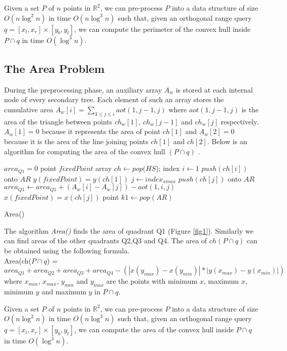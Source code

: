 \documentclass[runningheads,a4paper]{llncs}
\begin{document}
{\begin{theorem}
  Given a set $P$ of $n$ points in $\mathbb{R}^{2}$, we can pre-process $P$
  into a data structure of size $O(n \log^{2} n)$ in time $O(n \log^{3} n)$
  such that, given an orthogonal range query $q = [x_{l}, x_{r}] \times
  [y_{b}, y_{t}]$, we can compute the perimeter of the convex hull inside $P
  \cap q$ in time $O(\log^{3} n)$.
\end{theorem}

\subsection{The Area Problem}
During the preprocessing phase, an auxiliary array $A_{w}$ is stored at each
internal node of every secondary tree.  Each element of such an array stores
the cumulative area $A_{w}[i]=\displaystyle\sum\limits_{3\le j\le i}
aot(1,j-1,j)$ where $aot(1,j-1,j)$ is the area of the triangle between points
$ch_{w}[1]$, $ch_{w}[j-1]$ and $ch_{w}[j]$ respectively.  $A_{w}[1]=0$ because
it represents the area of point $ch[1]$ and $A_{w}[2]=0$ because it is the area
of the line joining points $ch[1]$ and $ch[2]$. Below is an algorithm for computing the area of the convex hull $(P \cap q)$ .
\begin{algorithm}
  $area_{Q1}=0$\;
  point $fixedPoint$
  array $ch \leftarrow pop(HS$);
  index $i \leftarrow 1$\;
  $push(ch[i])$ onto $AR$\;
  $y(fixedPoint) = y(ch[1])$\;
  $j \leftarrow index_{xmax}$\;
  $push(ch[j])$ onto $AR$\;
  $area_{Q1} \leftarrow area_{Q1}+(A_{w}[i]-A_{w}[j]) - aot(1,i,j)$\;
  $x(fixedPoint) = x(ch[j])$\;
  point $k1 \leftarrow pop(AR)$\;
\caption{Area()}\end{algorithm}
\vspace{-0.6cm}
The  algorithm {\em Area()} finds the area of quadrant Q1 (Figure
\ref{fig1}). Similarly we can find areas of the other quadrants Q2,Q3 and
Q4. The area of $ch(P \cap q)$ can be obtained using the following formula.\\
Area(ch($P \cap q$) = $area_{Q1}+area_{Q2}+area_{Q3}+area_{Q4} - (|x(y_{max})
- x(y_{min})|*|y(x_{max}) - y(x_{min})|)$ where $x_{min}$, $x_{max}$, $y_{min}$ and $y_{max}$
are the points with minimum $x$, maximum $x$, minimum $y$ and maximum $y$ in $P \cap q$.
\begin{theorem}
  Given a set $P$ of $n$ points in $\mathbb{R}^{2}$, we can pre-process $P$
  into a data structure of size $O(n \log^{2} n)$ in time $O(n \log^{3} n)$
  such that, given an orthogonal range query $q = [x_{l}, x_{r}] \times
  [y_{b}, y_{t}]$, we can compute the area of the convex hull inside $P \cap
  q$ in time $O(\log^{3} n)$.
\end{theorem}

}
\end{document}
